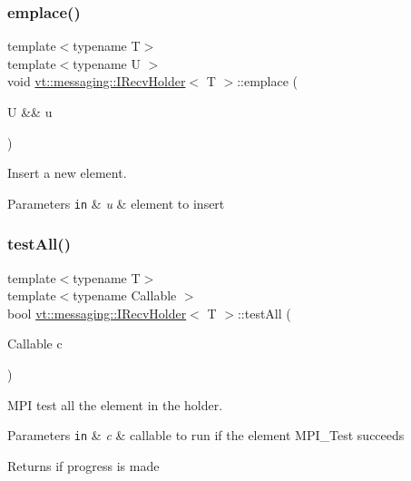 \subsubsection{\texorpdfstring{emplace()}{emplace()}}
{\footnotesize\ttfamily template$<$typename T$>$ \\
template$<$typename U $>$ \\
void \hyperlink{structvt_1_1messaging_1_1_i_recv_holder}{vt\+::messaging\+::\+I\+Recv\+Holder}$<$ T $>$\+::emplace (\begin{DoxyParamCaption}\item[{U \&\&}]{u }\end{DoxyParamCaption})\hspace{0.3cm}{\ttfamily [inline]}}



Insert a new element. 


\begin{DoxyParams}[1]{Parameters}
\mbox{\tt in}  & {\em u} & element to insert \\
\hline
\end{DoxyParams}
\mbox{\label{structvt_1_1messaging_1_1_i_recv_holder_a5c25ae9371ef928b00c42405d9d00a38}} 
\subsubsection{\texorpdfstring{test\+All()}{testAll()}}
{\footnotesize\ttfamily template$<$typename T$>$ \\
template$<$typename Callable $>$ \\
bool \hyperlink{structvt_1_1messaging_1_1_i_recv_holder}{vt\+::messaging\+::\+I\+Recv\+Holder}$<$ T $>$\+::test\+All (\begin{DoxyParamCaption}\item[{Callable}]{c }\end{DoxyParamCaption})\hspace{0.3cm}{\ttfamily [inline]}}



M\+PI test all the element in the holder. 


\begin{DoxyParams}[1]{Parameters}
\mbox{\tt in}  & {\em c} & callable to run if the element {\ttfamily M\+P\+I\+\_\+\+Test} succeeds\\
\hline
\end{DoxyParams}
\begin{DoxyReturn}{Returns}
if progress is made 
\end{DoxyReturn}


